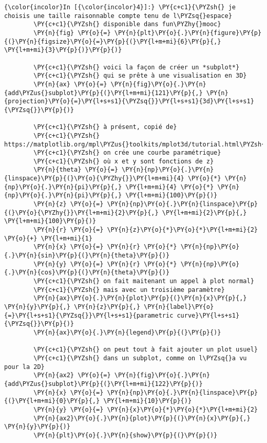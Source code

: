     \begin{Verbatim}[commandchars=\\\{\},frame=single,framerule=0.3mm,rulecolor=\color{cellframecolor}]
{\color{incolor}In [{\color{incolor}4}]:} \PY{c+c1}{\PYZsh{} je choisis une taille raisonnable compte tenu de l\PYZsq{}espace}
        \PY{c+c1}{\PYZsh{} disponible dans fun\PYZhy{}mooc}
        \PY{n}{fig} \PY{o}{=} \PY{n}{plt}\PY{o}{.}\PY{n}{figure}\PY{p}{(}\PY{n}{figsize}\PY{o}{=}\PY{p}{(}\PY{l+m+mi}{6}\PY{p}{,} \PY{l+m+mi}{3}\PY{p}{)}\PY{p}{)}
        
        \PY{c+c1}{\PYZsh{} voici la façon de créer un *subplot*}
        \PY{c+c1}{\PYZsh{} qui se prête à une visualisation en 3D}
        \PY{n}{ax} \PY{o}{=} \PY{n}{fig}\PY{o}{.}\PY{n}{add\PYZus{}subplot}\PY{p}{(}\PY{l+m+mi}{121}\PY{p}{,} \PY{n}{projection}\PY{o}{=}\PY{l+s+s1}{\PYZsq{}}\PY{l+s+s1}{3d}\PY{l+s+s1}{\PYZsq{}}\PY{p}{)}
        
        \PY{c+c1}{\PYZsh{} à présent, copié de}
        \PY{c+c1}{\PYZsh{} https://matplotlib.org/mpl\PYZus{}toolkits/mplot3d/tutorial.html\PYZsh{}line\PYZhy{}plots}
        \PY{c+c1}{\PYZsh{} on crée une courbe paramétrique}
        \PY{c+c1}{\PYZsh{} où x et y sont fonctions de z}
        \PY{n}{theta} \PY{o}{=} \PY{n}{np}\PY{o}{.}\PY{n}{linspace}\PY{p}{(}\PY{o}{\PYZhy{}}\PY{l+m+mi}{4} \PY{o}{*} \PY{n}{np}\PY{o}{.}\PY{n}{pi}\PY{p}{,} \PY{l+m+mi}{4} \PY{o}{*} \PY{n}{np}\PY{o}{.}\PY{n}{pi}\PY{p}{,} \PY{l+m+mi}{100}\PY{p}{)}
        \PY{n}{z} \PY{o}{=} \PY{n}{np}\PY{o}{.}\PY{n}{linspace}\PY{p}{(}\PY{o}{\PYZhy{}}\PY{l+m+mi}{2}\PY{p}{,} \PY{l+m+mi}{2}\PY{p}{,} \PY{l+m+mi}{100}\PY{p}{)}
        \PY{n}{r} \PY{o}{=} \PY{n}{z}\PY{o}{*}\PY{o}{*}\PY{l+m+mi}{2} \PY{o}{+} \PY{l+m+mi}{1}
        \PY{n}{x} \PY{o}{=} \PY{n}{r} \PY{o}{*} \PY{n}{np}\PY{o}{.}\PY{n}{sin}\PY{p}{(}\PY{n}{theta}\PY{p}{)}
        \PY{n}{y} \PY{o}{=} \PY{n}{r} \PY{o}{*} \PY{n}{np}\PY{o}{.}\PY{n}{cos}\PY{p}{(}\PY{n}{theta}\PY{p}{)}
        \PY{c+c1}{\PYZsh{} on fait maitenant un appel à plot normal}
        \PY{c+c1}{\PYZsh{} mais avec un troisième paramètre}
        \PY{n}{ax}\PY{o}{.}\PY{n}{plot}\PY{p}{(}\PY{n}{x}\PY{p}{,} \PY{n}{y}\PY{p}{,} \PY{n}{z}\PY{p}{,} \PY{n}{label}\PY{o}{=}\PY{l+s+s1}{\PYZsq{}}\PY{l+s+s1}{parametric curve}\PY{l+s+s1}{\PYZsq{}}\PY{p}{)}
        \PY{n}{ax}\PY{o}{.}\PY{n}{legend}\PY{p}{(}\PY{p}{)}
        
        \PY{c+c1}{\PYZsh{} on peut tout à fait ajouter un plot usuel}
        \PY{c+c1}{\PYZsh{} dans un subplot, comme on l\PYZsq{}a vu pour la 2D}
        \PY{n}{ax2} \PY{o}{=} \PY{n}{fig}\PY{o}{.}\PY{n}{add\PYZus{}subplot}\PY{p}{(}\PY{l+m+mi}{122}\PY{p}{)}
        \PY{n}{x} \PY{o}{=} \PY{n}{np}\PY{o}{.}\PY{n}{linspace}\PY{p}{(}\PY{l+m+mi}{0}\PY{p}{,} \PY{l+m+mi}{10}\PY{p}{)}
        \PY{n}{y} \PY{o}{=} \PY{n}{x}\PY{o}{*}\PY{o}{*}\PY{l+m+mi}{2}
        \PY{n}{ax2}\PY{o}{.}\PY{n}{plot}\PY{p}{(}\PY{n}{x}\PY{p}{,} \PY{n}{y}\PY{p}{)}
        \PY{n}{plt}\PY{o}{.}\PY{n}{show}\PY{p}{(}\PY{p}{)}
\end{Verbatim}


